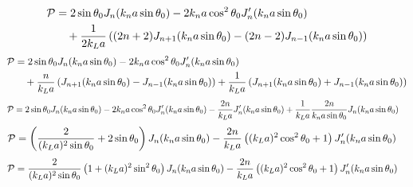 \begin{align}
    {\cal P} & =2\sin\theta_0J_n(k_na\sin\theta_0) -2{k_na}\cos^2\theta_0J'_{n}(k_na\sin\theta_0)\nonumber       \\
             & \quad+\frac{1}{2k_La}\left((2n+2)J_{n+1}(k_na\sin\theta_0)-(2n-2)J_{n-1}(k_na\sin\theta_0)\right)
\end{align}
\begin{align}
    {\cal P} & =2\sin\theta_0J_n(k_na\sin\theta_0) -2{k_na}\cos^2\theta_0J'_{n}(k_na\sin\theta_0)\nonumber                                                                         \\
             & \quad+\frac{n}{k_La}\left(J_{n+1}(k_na\sin\theta_0)-J_{n-1}(k_na\sin\theta_0)\right)+\frac{1}{k_La}\left(J_{n+1}(k_na\sin\theta_0)+J_{n-1}(k_na\sin\theta_0)\right)
\end{align}
\begin{align}
    {\cal P} & =2\sin\theta_0J_n(k_na\sin\theta_0) -2{k_na}\cos^2\theta_0J'_{n}(k_na\sin\theta_0)-\frac{2n}{k_La}J'_{n}(k_na\sin\theta_0)+\frac{1}{k_La}\frac{2n}{k_na\sin\theta_0}J_{n}(k_na\sin\theta_0)
\end{align}
\begin{align}
    {\cal P} & =\left(\frac{2}{(k_La)^2\sin\theta_0}+2\sin\theta_0\right)J_{n}(k_na\sin\theta_0)-\frac{2n}{k_La}\left((k_La)^2\cos^2\theta_0+1\right)J'_n(k_n a\sin\theta_0)
\end{align}
\begin{align}
    {\cal P} & =\frac{2}{(k_La)^2\sin\theta_0}\left(1+(k_La)^2\sin^2\theta_0\right)J_{n}(k_na\sin\theta_0)-\frac{2n}{k_La}\left((k_La)^2\cos^2\theta_0+1\right)J'_n(k_n a\sin\theta_0)
\end{align}

